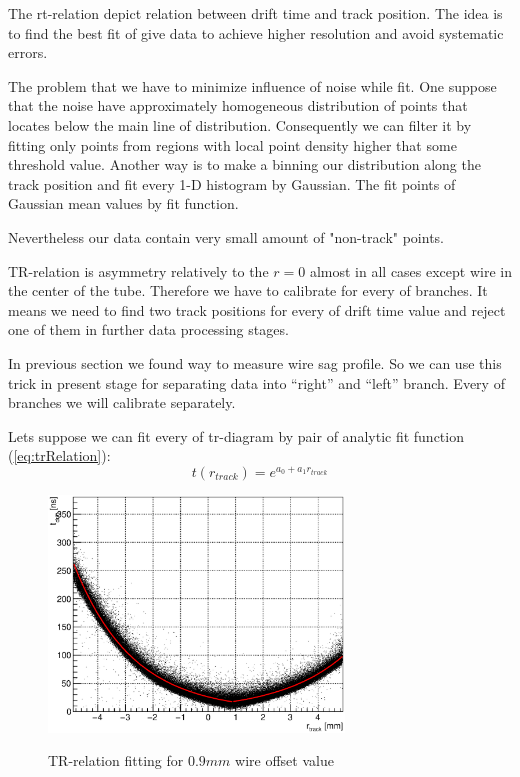 \documentclass[]{article}
\begin{document}
	The rt-relation depict relation between drift time and track position. The idea is to find the best fit of give data to achieve higher resolution and avoid systematic errors.
	
	The problem that we have to minimize influence of noise while fit. One suppose that the noise have approximately homogeneous distribution of points that locates below the main line of distribution. Consequently we can filter it by fitting only points from regions with local point density higher that some threshold value. Another way is to make a binning our distribution along the track position and fit every 1-D histogram by Gaussian. The fit points of Gaussian mean values by fit function.    
	
	Nevertheless our data contain very small amount of "non-track" points.
	
	TR-relation is asymmetry relatively to the $r=0$ almost in all cases except wire in the center of the tube. Therefore we have to calibrate for every of branches. It means we need to find two track positions for every of drift time value and reject one of them in further data processing stages.
	
	In previous section we found way to measure wire sag profile. So we can use this trick in present stage for separating data into ``right'' and ``left'' branch. Every of branches we will calibrate separately.
	
	Lets suppose we can fit every of tr-diagram by pair of analytic fit function (\ref{eq:trRelation}):
	\begin{equation}
	t(r_{track}) = e^{a_0 + a_1r_{track}}
	\label{eq:trRelation}
	\end{equation}
	
	\begin{figure}[h!]
	\centering
	\includegraphics[width=0.7\textwidth]{TRrelation_09_points}
	\label{fig:TRrelation09points}
	\caption{TR-relation fitting for $0.9 mm$ wire offset value}
	\end{figure}
	
\end{document}
